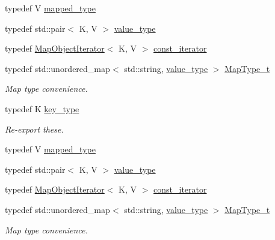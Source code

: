 \begin{DoxyCompactItemize}
typedef V \mbox{\hyperlink{classADAT_1_1MapObject_ad307fa02da187571a964db1e195a3caa}{mapped\+\_\+type}}
\item 
typedef std\+::pair$<$ K, V $>$ \mbox{\hyperlink{classADAT_1_1MapObject_ad985e6ff5b35a72c79d4b466d316cc0a}{value\+\_\+type}}
\item 
typedef \mbox{\hyperlink{classADAT_1_1MapObjectIterator}{Map\+Object\+Iterator}}$<$ K, V $>$ \mbox{\hyperlink{classADAT_1_1MapObject_a4622cd7d3b6fed18fe226d28091cc6c8}{const\+\_\+iterator}}
\item 
typedef std\+::unordered\+\_\+map$<$ std\+::string, \mbox{\hyperlink{classADAT_1_1MapObject_ad985e6ff5b35a72c79d4b466d316cc0a}{value\+\_\+type}} $>$ \mbox{\hyperlink{classADAT_1_1MapObject_ad6a4952087d3de5a43d08b2ea2ad270b}{Map\+Type\+\_\+t}}
\begin{DoxyCompactList}\small\item\em Map type convenience. \end{DoxyCompactList}\item 
typedef K \mbox{\hyperlink{classADAT_1_1MapObject_a98d458cd1ecd1265ae5451619de933db}{key\+\_\+type}}
\begin{DoxyCompactList}\small\item\em Re-\/export these. \end{DoxyCompactList}\item 
typedef V \mbox{\hyperlink{classADAT_1_1MapObject_ad307fa02da187571a964db1e195a3caa}{mapped\+\_\+type}}
\item 
typedef std\+::pair$<$ K, V $>$ \mbox{\hyperlink{classADAT_1_1MapObject_ad985e6ff5b35a72c79d4b466d316cc0a}{value\+\_\+type}}
\item 
typedef \mbox{\hyperlink{classADAT_1_1MapObjectIterator}{Map\+Object\+Iterator}}$<$ K, V $>$ \mbox{\hyperlink{classADAT_1_1MapObject_a4622cd7d3b6fed18fe226d28091cc6c8}{const\+\_\+iterator}}
\item 
typedef std\+::unordered\+\_\+map$<$ std\+::string, \mbox{\hyperlink{classADAT_1_1MapObject_ad985e6ff5b35a72c79d4b466d316cc0a}{value\+\_\+type}} $>$ \mbox{\hyperlink{classADAT_1_1MapObject_ad6a4952087d3de5a43d08b2ea2ad270b}{Map\+Type\+\_\+t}}
\begin{DoxyCompactList}\small\item\em Map type convenience. \end{DoxyCompactList}\end{DoxyCompactItemize}
